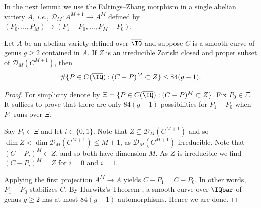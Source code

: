 In the next lemma we use the Faltings--Zhang morphism in a single
abelian variety $A$, \textit{i.e.}, $\mathscr{D}_M \colon
A^{M+1}\rightarrow A^M$ defined by $(P_0,\ldots,P_M)\mapsto
(P_1-P_0,\ldots,P_M-P_0)$.

\begin{lemma}
\notready\label{LemmaPacketsAlternative3}
  Let $A$ be an abelian variety defined over $\overline{\IQ}$ and
  suppose $C$ is a smooth curve of genus $g\ge
  2$ contained in $A$. If $Z$ is an irreducible Zariski
  closed and proper subset of $\mathscr{D}_M(C^{M+1})$,
  then
  \begin{equation*}
    \#\{ P \in C(\overline{\IQ}) : (C-P)^M \subset Z
    \} \le 84(g-1).
  \end{equation*}
\end{lemma}
\begin{proof}
For simplicity denote by $\Xi = \{ P \in C(\overline{\IQ}) : (C-P)^M
\subset Z \}$. %
%
Fix $P_0\in \Xi$. It suffices to prove that there are only $84(g-1)$
possibilities for $P_1 - P_0$ when $P_1$ runs over $\Xi$.

Say $P_1 \in \Xi$ and let $i\in \{0,1\}$.
Note that
$Z\subsetneq \mathscr{D}_M(C^{M+1})$ and so
 $\dim Z < \dim \mathscr{D}_M(C^{M+1})\le M+1$,
as $\mathscr{D}_M(C^{M+1})$ irreducible.
Note that $(C-P_i)^M\subset Z$, and so both have dimension $M$.
As $Z$ is irreducible we find
 $(C - P_i)^M=Z$ for $i=0$ and $i=1$.

Applying the first projection  $A^M\rightarrow A$ yields $C-P_1=C-P_0$. In other words, $P_1-P_0$
stabilizes $C$. By Hurwitz's Theorem \cite{Hurwitz1892}, a smooth curve over $\IQbar$ of
genus $g\ge 2$ has at most $84(g-1)$ automorphisms.
Hence we are done.
\end{proof}



